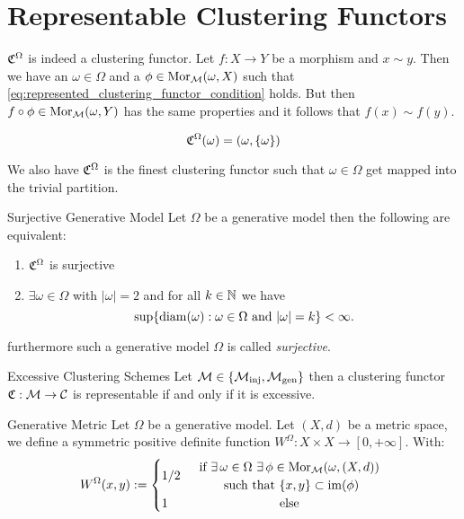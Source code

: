 \section{Representable Clustering Functors}


$\mathfrak{C}^\Omega$ is indeed a clustering functor. Let $f: X \to Y$ be a morphism and $x \sim y$. Then we have an $\omega \in \Omega$ and a $\phi \in \mathrm {Mor}_{\mathcal{M}}(\omega, X)$ such that \eqref{eq:represented_clustering_functor_condition} holds. But then $f \circ \phi \in \mathrm {Mor}_{\mathcal{M}}(\omega,Y)$ has the same properties and it follows that $f(x) \sim f(y)$.

\begin{myremark}{}{}

$$
\mathfrak{C}^\Omega(\omega) = (\omega, \{\omega\})
$$

We also have $\mathfrak{C}^\Omega$ is the finest clustering functor such that $\omega \in \Omega$ get mapped into the trivial partition.
\end{myremark}

\begin{proposition}{Surjective Generative Model}{}
\newresult
Let $\Omega$ be a generative model then the following are equivalent:
\begin{enumerate}
    \item $\mathfrak{C}^\Omega$ is surjective
    \item $\exists \omega \in \Omega$ with $|\omega| = 2$ and for all $k \in \mathbb N$ we have 
    $$
    \sup\{\mathrm{diam}(\omega): \omega \in \Omega \text{ and } |\omega| = k\} < \infty.
    $$ 
\end{enumerate}
furthermore such a generative model $\Omega$ is called \emph{surjective}.
\end{proposition}





\begin{theorem}{Excessive Clustering Schemes}{}
Let $\mathcal{M} \in \{{\mathcal{M}_\mathrm{inj}}, {\mathcal{M}_\mathrm{gen}}\}$ then a clustering functor $\mathfrak{C}: \mathcal{M} \to \mathcal{C}$ is representable if and only if it is excessive.
\end{theorem}

\begin{definition}{Generative Metric \cite{Carlsson2010}}{}
Let $\Omega$ be a generative model. Let $(X,d)$ be a metric space, we define a symmetric positive definite function $W^\Omega: X \times X \to [0,+\infty]$. With:
\begin{equation*}
W^\Omega(x,y) := \begin{cases}
    1/2 & 
    \begin{array}{cc}
         \text{if } \exists \, \omega \in \Omega \ \exists \, \phi \in \mor_{\M}(\omega, (X,d))\\
         \text{ such that } \{x,y\} \subset \image(\phi)
    \end{array}\\
    1 & \hfil \text{else}
\end{cases}
\end{equation*}
\end{definition}




